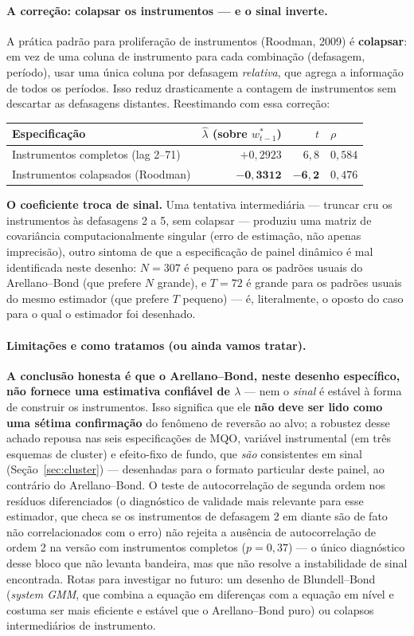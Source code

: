 \documentclass[11pt,a4paper]{article}
\newcommand{\limitacoes}[0]{\paragraph{Limitações e como tratamos (ou ainda vamos tratar).}}
\begin{document}
\paragraph{A correção: colapsar os instrumentos --- e o sinal inverte.} A prática padrão para
proliferação de instrumentos (Roodman, 2009) é \textbf{colapsar}: em vez de uma coluna de
instrumento para cada combinação (defasagem, período), usar uma única coluna por defasagem
\emph{relativa}, que agrega a informação de todos os períodos. Isso reduz drasticamente a
contagem de instrumentos sem descartar as defasagens distantes. Reestimando com essa correção:
\begin{center}\small
\begin{tabular}{@{}lrrl@{}}
\toprule
Especificação & $\widehat\lambda$ (sobre $w^*_{t-1}$) & $t$ & $\rho$ \\
\midrule
Instrumentos completos (lag 2--71) & $+0{,}2923$ & $6{,}8$ & $0{,}584$ \\
Instrumentos colapsados (Roodman)  & $\mathbf{-0{,}3312}$ & $\mathbf{-6{,}2}$ & $0{,}476$ \\
\bottomrule
\end{tabular}
\end{center}
\textbf{O coeficiente troca de sinal.} Uma tentativa intermediária --- truncar cru os
instrumentos às defasagens 2 a 5, sem colapsar --- produziu uma matriz de covariância
computacionalmente singular (erro de estimação, não apenas imprecisão), outro sintoma de que a
especificação de painel dinâmico é mal identificada neste desenho: $N=307$ é pequeno para os
padrões usuais do Arellano--Bond (que prefere $N$ grande), e $T=72$ é grande para os padrões
usuais do mesmo estimador (que prefere $T$ pequeno) --- é, literalmente, o oposto do caso para o
qual o estimador foi desenhado.

\limitacoes \textbf{A conclusão honesta é que o Arellano--Bond, neste desenho específico, não
fornece uma estimativa confiável de $\lambda$} --- nem o \emph{sinal} é estável à forma de
construir os instrumentos. Isso significa que ele \textbf{não deve ser lido como uma sétima
confirmação} do fenômeno de reversão ao alvo; a robustez desse achado repousa nas seis
especificações de MQO, variável instrumental (em três esquemas de cluster) e efeito-fixo de
fundo, que \emph{são} consistentes em sinal (Seção~\ref{sec:cluster}) --- desenhadas para o
formato particular deste painel, ao contrário do Arellano--Bond. O teste de autocorrelação de
segunda ordem nos resíduos diferenciados (o diagnóstico de validade mais relevante para esse
estimador, que checa se os instrumentos de defasagem 2 em diante são de fato não correlacionados
com o erro) não rejeita a ausência de autocorrelação de ordem 2 na versão com instrumentos
completos ($p=0{,}37$) --- o único diagnóstico desse bloco que não levanta bandeira, mas que não
resolve a instabilidade de sinal encontrada. Rotas para investigar no futuro: um desenho de
Blundell--Bond (\emph{system GMM}, que combina a equação em diferenças com a equação em nível e
costuma ser mais eficiente e estável que o Arellano--Bond puro) ou colapsos intermediários de
instrumento.
\end{document}
